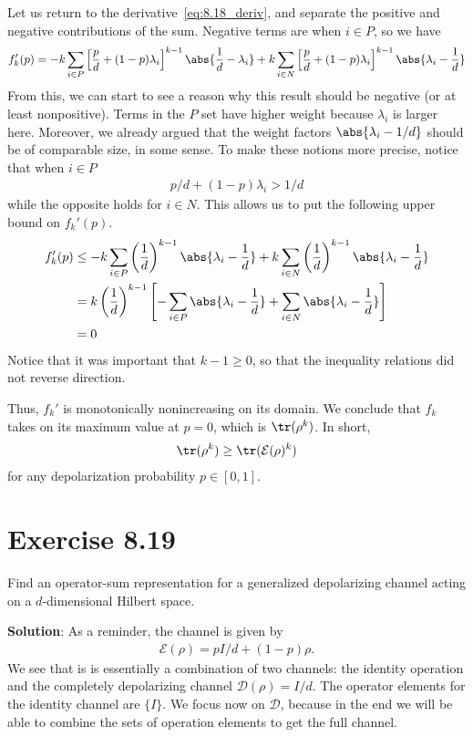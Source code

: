 \documentclass{book}
\begin{document}
    Let us return to the derivative~\eqref{eq:8.18_deriv}, and separate the positive and negative contributions of the sum. Negative terms are when $i \in P$, so we have
    \begin{align}
        f_k'(p) =  -k \sum_{i\in P }  \left[\frac{p}{d} + (1-p) \lambda_i\right]^{k-1} \abs{\frac1d - \lambda_i} + k \sum_{i\in N} \left[\frac{p}{d} + (1-p) \lambda_i\right]^{k-1} \abs{\lambda_i- \frac1d}
    \end{align}
    From this, we can start to see a reason why this result should be negative (or at least nonpositive). Terms in the $P$ set have higher weight because $\lambda_i$ is larger here. Moreover, we already argued that the weight factors $\abs{\lambda_i - 1/d}$ should be of comparable size, in some sense. To make these notions more precise, notice that when $i\in P$
    \begin{align}
        p/d + (1-p)\lambda_i > 1/d
    \end{align}
    while the opposite holds for $i \in N$. This allows us to put the following upper bound on $f_k'(p)$.
    \begin{align}
        f_k'(p) &\leq -k \sum_{i\in P} \left(\frac1d\right)^{k-1}\abs{\lambda_i- \frac1d} + k \sum_{i\in N} \left(\frac1d\right)^{k-1}\abs{\lambda_i- \frac1d} \\
        &= k \left(\frac1d\right)^{k-1}\left[-\sum_{i\in P}\abs{\lambda_i- \frac1d} + \sum_{i\in N}\abs{\lambda_i- \frac1d}\right] \\
        &= 0
    \end{align}
    Notice that it was important that $k - 1 \geq 0$, so that the inequality relations did not reverse direction.

    Thus, $f_k'$ is monotonically nonincreasing on its domain. We conclude that $f_k$ takes on its maximum value at $p = 0$, which is $\tr(\rho^k)$. In short,
    \begin{align}
        \tr(\rho^k) \geq \tr(\mathcal{E}(\rho)^k)
    \end{align}
    for any depolarization probability $p \in [0,1]$.

\section*{Exercise 8.19}
    Find an operator-sum representation for a generalized depolarizing channel acting on a $d$-dimensional Hilbert space. 

    \textbf{Solution}: As a reminder, the channel is given by
    \begin{align}
        \mathcal{E}(\rho) = p I/d + (1-p)\rho.
    \end{align}
    We see that is is essentially a combination of two channels: the identity operation and the completely depolarizing channel $\mathcal{D}(\rho) = I/d$. The operator elements for the identity channel are $\{I\}$. We focus now on $\mathcal{D}$, because in the end we will be able to combine the sets of operation elements to get the full channel.
\end{document}
